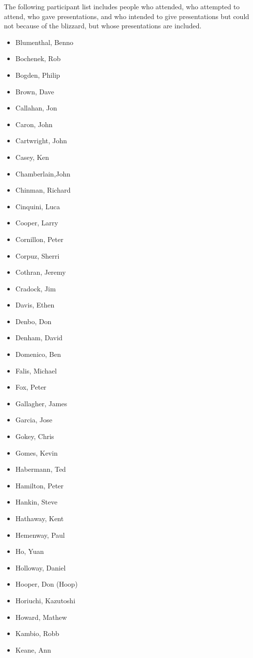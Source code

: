 The following participant list includes people who attended,
who attempted to attend, who gave presentations, and who intended
to give presentations but could not because of the blizzard, but
whose presentations are included.
\begin{itemize}
  \item Blumenthal, Benno
  \item Bochenek, Rob
  \item Bogden, Philip
  \item Brown, Dave
  \item Callahan, Jon
  \item Caron, John
  \item Cartwright, John
  \item Casey, Ken
  \item Chamberlain,John
  \item Chinman, Richard
  \item Cinquini, Luca
  \item Cooper, Larry
  \item Cornillon, Peter
  \item Corpuz, Sherri
  \item Cothran, Jeremy
  \item Cradock, Jim
  \item Davis, Ethen
  \item Denbo, Don
  \item Denham, David
  \item Domenico, Ben
  \item Falis, Michael
  \item Fox, Peter
  \item Gallagher, James
  \item Garcia, Jose
  \item Gokey, Chris
  \item Gomes, Kevin
  \item Habermann, Ted
  \item Hamilton, Peter
  \item Hankin, Steve
  \item Hathaway, Kent
  \item Hemenway, Paul
  \item Ho, Yuan
  \item Holloway, Daniel
  \item Hooper, Don (Hoop)
  \item Horiuchi, Kazutoshi
  \item Howard, Mathew
  \item Kambio, Robb
  \item Keane, Ann

\end{itemize}
